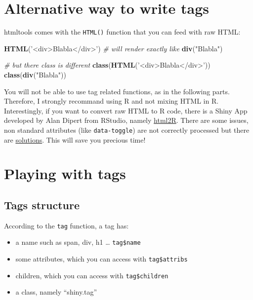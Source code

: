 \documentclass[]{book}
\newenvironment{Shaded}{\begin{snugshade}}{\end{snugshade}}
\newcommand{\CommentTok}[1]{\textcolor[rgb]{0.56,0.35,0.01}{\textit{#1}}}
\newcommand{\KeywordTok}[1]{\textcolor[rgb]{0.13,0.29,0.53}{\textbf{#1}}}
\newcommand{\NormalTok}[1]{#1}
\newcommand{\StringTok}[1]{\textcolor[rgb]{0.31,0.60,0.02}{#1}}
\providecommand{\tightlist}{%
  \setlength{\itemsep}{0pt}\setlength{\parskip}{0pt}}
\begin{document}
\hypertarget{alternative-way-to-write-tags}{%
\section{Alternative way to write tags}\label{alternative-way-to-write-tags}}

htmltools comes with the \texttt{HTML()} function that you can feed with raw HTML:

\begin{Shaded}
\begin{Highlighting}[]
\KeywordTok{HTML}\NormalTok{(}\StringTok{'<div>Blabla</div>'}\NormalTok{)}
\CommentTok{# will render exactly like}
\KeywordTok{div}\NormalTok{(}\StringTok{"Blabla"}\NormalTok{)}

\CommentTok{# but there class is different}
\KeywordTok{class}\NormalTok{(}\KeywordTok{HTML}\NormalTok{(}\StringTok{'<div>Blabla</div>'}\NormalTok{))}
\KeywordTok{class}\NormalTok{(}\KeywordTok{div}\NormalTok{(}\StringTok{"Blabla"}\NormalTok{))}
\end{Highlighting}
\end{Shaded}

You will not be able to use tag related functions, as in the following parts.
Therefore, I strongly recommand using R and not mixing HTML in R. Interestingly, if
you want to convert raw HTML to R code, there is a Shiny App developed by Alan
Dipert from RStudio, namely \href{https://github.com/alandipert/html2r}{html2R}. There
are some issues, non standard attributes (like \texttt{data-toggle}) are not correctly processed but there are \href{https://github.com/alandipert/html2r/issues/2}{solutions}. This will save you precious time!

\hypertarget{playing-with-tags}{%
\section{Playing with tags}\label{playing-with-tags}}

\hypertarget{tags-structure}{%
\subsection{Tags structure}\label{tags-structure}}

According to the \texttt{tag} function, a tag has:

\begin{itemize}
\tightlist
\item
  a name such as span, div, h1 \ldots{} \texttt{tag\$name}
\item
  some attributes, which you can access with \texttt{tag\$attribs}
\item
  children, which you can access with \texttt{tag\$children}
\item
  a class, namely ``shiny.tag''
\end{itemize}
\end{document}
